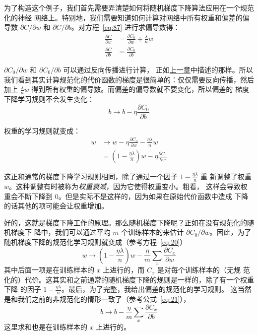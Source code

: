 为了构造这个例子，我们首先需要弄清楚如何将随机梯度下降算法应用在一个规范化的神经
网络上。特别地，我们需要知道如何计算对网络中所有权重和偏差的偏导数 $\partial
C/\partial w$ 和 $\partial C/\partial b$。对方程~\eqref{eq:87} 进行求偏导数得：
\begin{align}
  \frac{\partial C}{\partial w} & = \frac{\partial C_0}{\partial w} +
                                  \frac{\lambda}{n} w \label{eq:88}\tag{88} \\
  \frac{\partial C}{\partial b} & = \frac{\partial C_0}{\partial b} \label{eq:89}\tag{89}
\end{align}

$\partial C_0/\partial w$ 和 $\partial C_0/\partial b$ 可以通过反向传播进行计算，
正如\hyperref[ch:HowTheBackpropagationAlgorithmWorks]{上一章}中描述的那样。所以
我们看到其实计算规范化的代价函数的梯度是很简单的：仅仅需要反向传播，然后加上
$\frac{\lambda}{n} w$ 得到所有权重的偏导数。而偏差的偏导数就不要变化，所以偏差的
梯度下降学习规则不会发生变化：
\begin{equation}
  b \rightarrow b -\eta \frac{\partial C_0}{\partial b}
  \label{eq:90}\tag{90}
\end{equation}

权重的学习规则就变成：
\begin{align}
  w & \rightarrow w-\eta \frac{\partial C_0}{\partial
      w}-\frac{\eta \lambda}{n} w \label{eq:91}\tag{91}\\
    & = \left(1-\frac{\eta \lambda}{n}\right) w -\eta \frac{\partial
      C_0}{\partial w} \label{eq:92}\tag{92}
\end{align}

这正和通常的梯度下降学习规则相同，除了通过一个因子 $1-\frac{\eta\lambda}{n}$ 重
新调整了权重 $w$。这种调整有时被称为\emph{权重衰减}，因为它使得权重变小。粗看，
这样会导致权重会不断下降到 $0$。但是实际不是这样的，因为如果在原始代价函数中造成
下降的话其他的项可能会让权重增加。

好的，这就是梯度下降工作的原理。那么随机梯度下降呢？正如在没有规范化的随机梯度下
降中，我们可以通过平均 $m$ 个训练样本的\minibatch{}来估计 $\partial C_0/\partial
w$。因此，为了随机梯度下降的规范化学习规则就变成（参考方程~\eqref{eq:20}）
\begin{equation}
  w \rightarrow \left(1-\frac{\eta \lambda}{n}\right) w -\frac{\eta}{m}
  \sum_x \frac{\partial C_x}{\partial w}
  \label{eq:93}\tag{93}
\end{equation}
其中后面一项是在训练样本的\minibatch{} $x$ 上进行的，而 $C_x$ 是对每个训练样本的（无规
  范化的）代价。这其实和之前通常的随机梯度下降的规则是一样的，除了有一个权重下降
的因子 $1-\frac{\eta \lambda}{n}$。最后，为了完整，我给出偏差的规范化的学习规则。
这当然是和我们之前的非规范化的情形一致了（参考公式~\eqref{eq:21}），
\begin{equation}
  b \rightarrow b - \frac{\eta}{m} \sum_x \frac{\partial C_x}{\partial b}
  \label{eq:94}\tag{94}
\end{equation}
这里求和也是在训练样本的\minibatch{} $x$ 上进行的。

